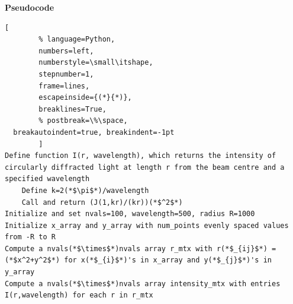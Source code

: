 \documentclass{article}
\newcommand{\code}{\texttt}
\begin{document}
\begin{enumerate}
\begin{enumerate}
    \textbf{Pseudocode}

    \begin{lstlisting}[
        % language=Python,
        numbers=left,
        numberstyle=\small\itshape,
        stepnumber=1,
        frame=lines,
        escapeinside={(*}{*)}, 
        breaklines=True,
        % postbreak=\%\space, 
  breakautoindent=true, breakindent=-1pt 
        ]   
Define function I(r, wavelength), which returns the intensity of circularly diffracted light at length r from the beam centre and a specified wavelength
    Define k=2(*$\pi$*)/wavelength
    Call and return (J(1,kr)/(kr))(*$^2$*)
Initialize and set nvals=100, wavelength=500, radius R=1000
Initialize x_array and y_array with num_points evenly spaced values from -R to R
Compute a nvals(*$\times$*)nvals array r_mtx with r(*$_{ij}$*) = (*$x^2+y^2$*) for x(*$_{i}$*)'s in x_array and y(*$_{j}$*)'s in y_array
Compute a nvals(*$\times$*)nvals array intensity_mtx with entries I(r,wavelength) for each r in r_mtx
    \end{lstlisting}

    \end{enumerate}


\end{enumerate}
\end{document}
